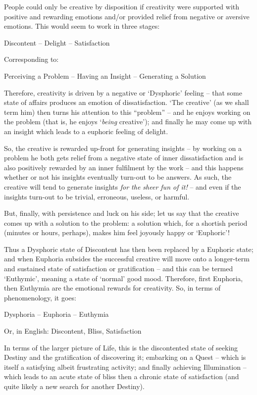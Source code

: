 \documentclass[
]{book}
\begin{document}
People could only be creative by disposition if creativity were supported with positive and rewarding emotions and/or provided relief from negative or aversive emotions. This would seem to work in three stages:

Discontent -- Delight -- Satisfaction

Corresponding to:

Perceiving a Problem -- Having an Insight -- Generating a Solution

Therefore, creativity is driven by a negative or `Dysphoric' feeling -- that some state of affairs produces an emotion of dissatisfaction. `The creative' (as we shall term him) then turns his attention to this ``problem'' -- and he enjoys working on the problem (that is, he enjoys `\emph{being} creative'); and finally he may come up with an insight which leads to a euphoric feeling of delight.

So, the creative is rewarded up-front for generating insights -- by working on a problem he both gets relief from a negative state of inner dissatisfaction and is also positively rewarded by an inner fulfilment by the work -- and this happens whether or not his insights eventually turn-out to be answers. As such, the creative will tend to generate insights \emph{for the sheer fun of it!} -- and even if the insights turn-out to be trivial, erroneous, useless, or harmful.

But, finally, with persistence and luck on his side; let us say that the creative comes up with a solution to the problem: a solution which, for a shortish period (minutes or hours, perhaps), makes him feel joyously happy or `Euphoric'!

Thus a Dysphoric state of Discontent has then been replaced by a Euphoric state; and when Euphoria subsides the successful creative will move onto a longer-term and sustained state of satisfaction or gratification -- and this can be termed `Euthymic', meaning a state of `normal' good mood. Therefore, first Euphoria, then Euthymia are the emotional rewards for creativity.
So, in terms of phenomenology, it goes:

Dysphoria -- Euphoria -- Euthymia

Or, in English: Discontent, Bliss, Satisfaction

In terms of the larger picture of Life, this is the discontented state of seeking Destiny and the gratification of discovering it; embarking on a Quest -- which is itself a satisfying albeit frustrating activity; and finally achieving Illumination -- which leads to an acute state of bliss then a chronic state of satisfaction (and quite likely a new search for another Destiny).
\end{document}
